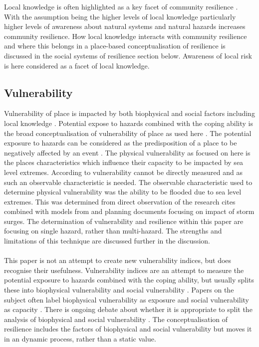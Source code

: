 Local knowledge is often highlighted as a key facet of community resilience \cite{setten_we_2019}. With the assumption being the higher levels of local knowledge particularly higher levels of awareness about natural systems and natural hazards increases community resilience.  How local knowledge interacts with community resilience and where this belongs in a place-based conceptualisation of resilience is discussed in the social systems of resilience section below. Awareness of local risk is here considered as a facet of local knowledge.  

 
 
\subsection{Vulnerability}
Vulnerability of place is impacted by both biophysical and social factors including local knowledge \cite{opach_seeking_2020}.  Potential expose to hazards combined with the coping ability is the broad conceptualisation of vulnerability of place as used here \cite{rygel_method_2006}. The potential exposure to hazards can be considered as the predisposition of a place to be negatively affected by an event \cite{lujala_quantifying_2014}. The physical vulnerability as focused on here is the places characteristics which influence their capacity to be impacted by sea level extremes. According to \cite{rod_integrated_2012} vulnerability cannot be directly measured and as such an observable characteristic is needed.  The observable characteristic used to determine physical vulnerability was the ability to be flooded due to sea level extremes. This was determined from direct observation of the research cites combined with models from \cite{kartverket_se_2020} and planning documents focusing on impact of storm surges\cite{miljoenheten_og_byplankontoret_trondheim_kommune_9-notat-om-havnivastigning-og-stormflo---hensyn-i-arealplanlegging-nyhavnapdf_2020}. The determination of vulnerability and resilience within this paper are focusing on single hazard, rather than multi-hazard. The strengths and limitations of this technique are discussed further in the discussion. 
\paragraph{}
This paper is not an attempt to create new vulnerability indices, but does recognise their usefulness. Vulnerability indices are an attempt to measure the potential exposure to hazards combined with the coping ability, but usually splits these into biophysical vulnerability  and social vulnerability \cite{rod_integrated_2012}. Papers on the subject often label biophysical vulnerability as exposure and social vulnerability as capacity \cite{rod_integrated_2012}. There is ongoing debate about whether it is appropriate to split the analysis of biophysical and social vulnerability \cite{lujala_quantifying_2014}. The conceptualisation of resilience includes the factors of biophysical and social vulnerability but moves it in an dynamic process, rather than a static value.

